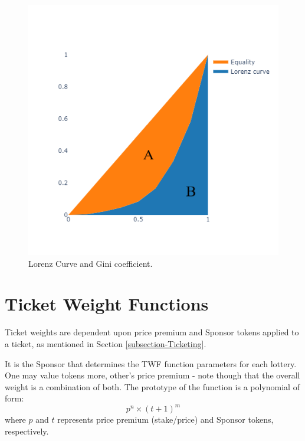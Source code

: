 \documentclass[runningheads]{llncs}
\begin{document}
\begin{figure}[H]
\centering
\includegraphics[scale=0.7]{Figures_and_Tables/LorenzCurve.png}
\caption{Lorenz Curve and Gini coefficient.}
\label{fig:Lorenz}
\end{figure}



\section{Ticket Weight Functions}\label{APP-TWF}
Ticket weights are dependent upon price premium and Sponsor tokens applied to a ticket, as mentioned in Section \ref{subsection-Ticketing}.

It is the Sponsor that determines the TWF function parameters for each lottery. One may value tokens more, other's price premium - note though that the overall weight is a combination of both. The prototype of the function is a polynomial of form:
$$
p^n \times (t+1)^m
$$
where $p$ and $t$ represents price premium (stake/price) and Sponsor tokens, respectively.
\end{document}
